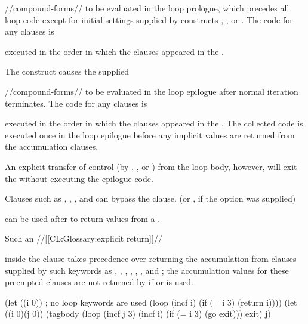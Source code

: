 //compound-forms// to be evaluated in the loop prologue, which precedes all loop code except for  initial settings supplied by constructs , , or .
  The code for any  clauses is 

executed in the order in which the clauses appeared in
  the .  

   The  construct causes the supplied

//compound-forms// to be evaluated in the loop epilogue after normal iteration terminates.
  The code for any  clauses is 

executed
 in the order in which the clauses appeared in
  the .  The collected code is executed once in the loop epilogue
  before any implicit values are returned from the accumulation clauses.

An explicit transfer of control (\eg by , , or ) from the loop body, however, will exit the 
   without executing the epilogue code.

  Clauses such as , , , and   can bypass the  clause.   (or , if the  option was supplied)

can be used after  to return values from a .   

Such an //[[CL:Glossary:explicit return]]//

inside the  clause takes precedence over returning the accumulation from clauses supplied by such keywords as , ,  , , , , and  ;  the accumulation values for these preempted clauses are not returned by   if  or  is used.
 

\endsubsubsection%

\endsubsection%


\code
 (let ((i 0))                     ; no loop keywords are used
    (loop (incf i) (if (= i 3) (return i)))) 
 (let ((i 0)(j 0))
    (tagbody
      (loop (incf j 3) (incf i) (if (= i 3) (go exit)))
      exit)
    j)  \endcode

